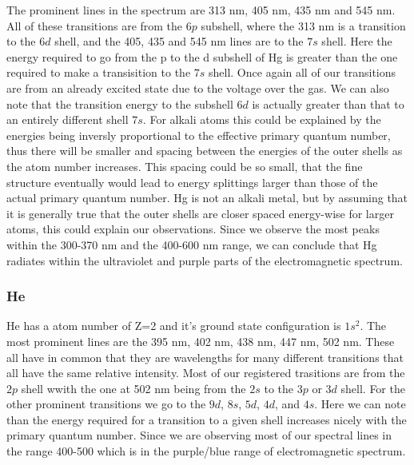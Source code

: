 The prominent lines in the spectrum are 313 nm, 405 nm, 435 nm and 545 nm. All of these transitions are from the $6p$ subshell, where the 313 nm is a transition to the $6d$ shell, and the 405, 435 and 545 nm lines are to the $7s$ shell. Here the energy required to go from the p to the d subshell of Hg is greater than the one required to make a transisition to the $7s$ shell. Once again all of our transitions are from an already excited state due to the voltage over the gas. We can also note that the transition energy to the subshell $6d$ is actually greater than that to an entirely different shell $7s$. For alkali atoms this could be explained by the energies being inversly proportional to the effective primary quantum number, thus there will be smaller and spacing between the energies of the outer shells as the atom number increases. This spacing could be so small, that the fine structure eventually would lead to energy splittings larger than those of the actual primary quantum number. Hg is not an alkali metal, but by assuming that it is generally true that the outer shells are closer spaced energy-wise for larger atoms, this could explain our observations. Since we observe the most peaks within the 300-370 nm and the 400-600 nm range, we can conclude that Hg radiates within the ultraviolet and purple parts of the electromagnetic spectrum. 

\subsubsection{He}

He has a atom number of Z=2 and it's ground state configuration is $1s^2$. The most prominent lines are the 395 nm, 402 nm, 438 nm, 447 nm, 502 nm. These all have in common that they are wavelengths for many different transitions that all have the same relative intensity. Most of our registered trasitions are from the $2p$ shell wwith the one at 502 nm being from the $2s$ to the $3p$ or $3d$ shell. For the other prominent transitions we go to the $9d$, $8s$, $5d$, $4d$, and $4s$. Here we can note than the energy required for a transition to a given shell increases nicely with the primary quantum number. Since we are observing most of our spectral lines in the range 400-500 which is in the purple/blue range of electromagnetic spectrum.  

